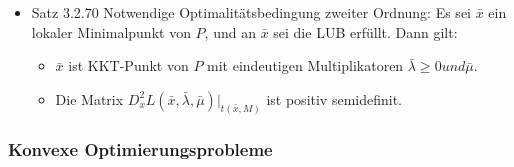 \documentclass[paper=a4, fontsize=11pt]{scrartcl} %
\numberwithin{equation}{section} %
\numberwithin{figure}{section} %
\numberwithin{table}{section} %
\begin{document}
\begin{itemize}
  \item Satz 3.2.70 Notwendige Optimalitätsbedingung zweiter Ordnung: Es sei $\bar{x}$ ein lokaler Minimalpunkt von $P$, und an $\bar{x}$ sei die LUB erfüllt. Dann gilt:
  \begin{itemize}
    \item $\bar{x}$ ist KKT-Punkt von $P$ mit eindeutigen Multiplikatoren $\bar{\lambda} \ge 0 und \bar{\mu}$.
    \item Die Matrix $D^2_x L(\bar{x},\bar{\lambda},\bar{\mu})|_{t(\bar{x},M)}$ ist positiv semidefinit.
  \end{itemize}
\end{itemize}

\subsubsection{Konvexe Optimierungsprobleme}
\end{document}
